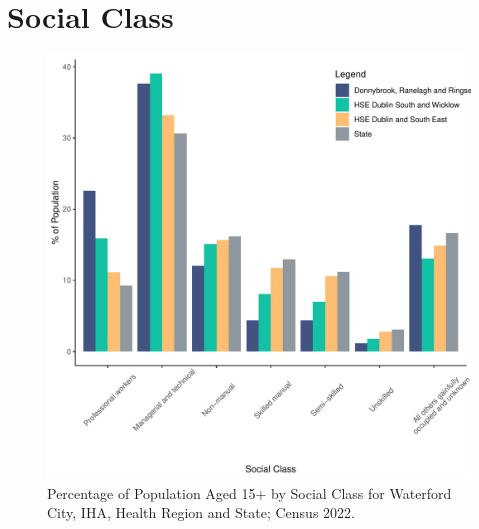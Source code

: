 \documentclass{article}
\begin{document}
\section{Social Class}\label{sect:SC}
\begin{figure}[H]
	\centering
	\includegraphics[width = 140mm]{../figures/SocialClassED.pdf}
	\caption{Percentage of Population Aged 15+ by Social Class for Waterford City, IHA, Health Region and State; Census 2022.}
	\label{fig:vbnv}
	\end{figure}
\end{document}
